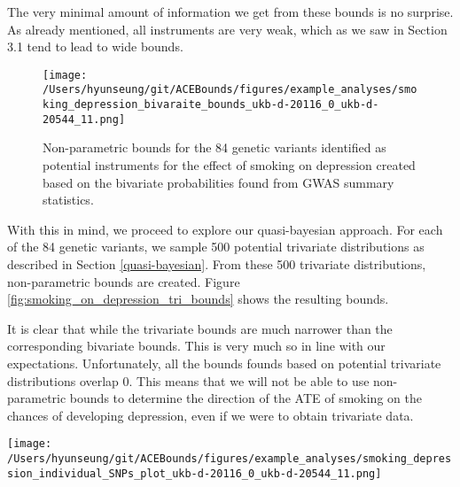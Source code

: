 \documentclass[
]{article}
\theoremstyle{plain}
\begin{document}
The very minimal amount of information we get from these bounds is no surprise. As already mentioned, all instruments are very weak, which as we saw in Section 3.1 tend to lead to wide bounds.

\begin{figure}[H]
  \texttt{[image: /Users/hyunseung/git/ACEBounds/figures/example\_analyses/smoking\_depression\_bivaraite\_bounds\_ukb-d-20116\_0\_ukb-d-20544\_11.png]}
  \caption{Non-parametric bounds for the 84 genetic variants identified as potential instruments for the effect of smoking on depression created based on the bivariate probabilities found from GWAS summary statistics.}
  \label{fig:smoking_on_depression_ind_bounds}
\end{figure}

With this in mind, we proceed to explore our quasi-bayesian approach. For each of the 84 genetic variants, we sample 500 potential trivariate distributions as described in Section \ref{quasi-bayesian}. From these 500 trivariate distributions, non-parametric bounds are created. Figure \ref{fig:smoking_on_depression_tri_bounds} shows the resulting bounds.

It is clear that while the trivariate bounds are much narrower than the corresponding bivariate bounds. This is very much so in line with our expectations. Unfortunately, all the bounds founds based on potential trivariate distributions overlap 0. This means that we will not be able to use non-parametric bounds to determine the direction of the ATE of smoking on the chances of developing depression, even if we were to obtain trivariate data.

\clearpage

\begin{sidewaysfigure}
  \texttt{[image: /Users/hyunseung/git/ACEBounds/figures/example\_analyses/smoking\_depression\_individual\_SNPs\_plot\_ukb-d-20116\_0\_ukb-d-20544\_11.png]}
    \caption{500 sets of bounds of the average treatment effect of smoking on depression for each of the 84 SNPs. Each bound is based on a set of values for the trivariate distribution randomly sampled. Bounds are color coded to show if they overlap 0 (grey) or do not (red). All bounds overlap 0.}
    \label{fig:smoking_on_depression_tri_bounds}
\end{sidewaysfigure}

\clearpage
\end{document}

